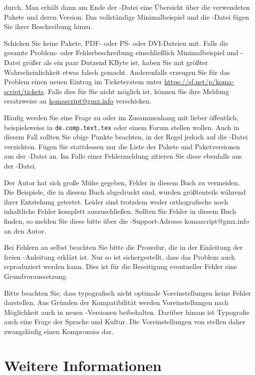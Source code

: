 {\begin{itemize}
    durch. Man erhält dann am Ende der -Datei eine Übersicht über
    die verwendeten Pakete und deren Version. Das vollständige Minimalbeispiel
    und die -Datei fügen Sie ihrer Beschreibung hinzu.
  \end{itemize}
  Schicken Sie keine Pakete, PDF- oder PS- oder DVI-Dateien mit.  Falls die
  gesamte Problem- oder Fehlerbeschreibung einschließlich Minimalbeispiel und
  -Datei größer als ein paar Dutzend KByte ist, haben Sie mit
  größter Wahrscheinlichkeit etwas falsch gemacht. Anderenfalls erzeugen Sie
  für das Problem einen neuen Eintrag im Ticketsystem unter
  \url{https://sf.net/p/koma-script/tickets}. Falls dies für Sie nicht möglich
  ist, können Sie ihre Meldung ersatzweise an
  \href{mailto:komascript@gmx.info}{komascript@gmx.info} verschicken.

  Häufig werden Sie eine Frage zu \KOMAScript{} oder im Zusammenhang mit
  \KOMAScript{} lieber öffentlich, beispielsweise in \texttt{de.comp.text.tex}
  oder einem Forum stellen wollen. Auch in diesem Fall sollten Sie obige
  Punkte beachten, in der Regel jedoch auf die -Datei
  verzichten. Fügen Sie stattdessen nur die Liste der Pakete und
  Paketversionen aus der -Datei an. Im Falle einer Fehlermeldung
  zitieren Sie diese ebenfalls aus der -Datei.%
}{%
  Der Autor hat sich große Mühe gegeben, Fehler in diesem Buch zu
  vermeiden. Die Beispiele, die in diesem Buch abgedruckt sind, wurden
  größtenteils während ihrer Entstehung getestet. Leider sind trotzdem weder
  orthografische noch inhaltliche Fehler komplett auszuschließen. Sollten Sie
  Fehler in diesem Buch finden, so melden Sie diese bitte über die
  \KOMAScript-Support-Adresse \mbox{komascript@gmx.info} an den Autor.

  Bei Fehlern an \KOMAScript{} selbst beachten Sie bitte die Prozedur, die in
  der Einleitung der freien \KOMAScript-Anleitung erklärt ist. Nur so ist
  sichergestellt, dass das Problem auch reproduziert werden kann. Dies ist
  für die Beseitigung eventueller Fehler eine Grundvoraussetzung.%
}

Bitte beachten Sie, dass typografisch nicht optimale Voreinstellungen keine
Fehler darstellen. Aus Gründen der Kompatibilität werden Voreinstellungen nach
Möglichkeit auch in neuen \KOMAScript-Versionen beibehalten. Darüber hinaus
ist Typografie auch eine Frage der Sprache und Kultur. Die Voreinstellungen
von \KOMAScript{} stellen daher zwangsläufig einen Kompromiss dar.

\section{Weitere Informationen}

